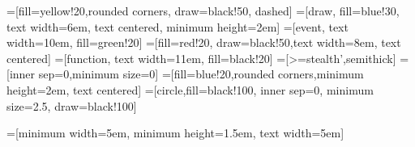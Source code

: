 =[fill=yellow!20,rounded corners, draw=black!50, dashed]
=[draw, fill=blue!30, text width=6em, 
    text centered, minimum height=2em]
=[event, text width=10em, fill=green!20]
=[fill=red!20, draw=black!50,text width=8em, text centered]
=[function, text width=11em, fill=black!20]
=[>=stealth',semithick]
=[inner sep=0,minimum size=0]
=[fill=blue!20,rounded corners,minimum height=2em, text centered]
=[circle,fill=black!100, inner sep=0, minimum size=2.5, draw=black!100]

\def\defw{5em}
\def\defh{1.5em}
\def\shift{0.5cm}

=[minimum width=\defw, minimum height=\defh, text width=\defw]

